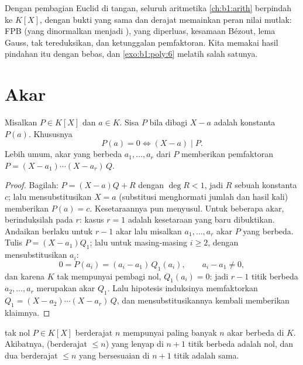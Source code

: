 \begin{remark}[{Aritmetika $K[X]$}]
Dengan pembagian Euclid di tangan, seluruh aritmetika
\cref{ch:b1:arith} berpindah ke $K[X]$, dengan bukti yang sama dan derajat
memainkan peran nilai mutlak: FPB (yang dinormalkan menjadi ),
 yang diperluas, kesamaan Bézout, lema Gauss,
 tak tereduksikan, dan ketunggalan pemfaktoran. Kita memakai hasil
pindahan itu dengan bebas, dan \cref{exo:b1:poly:6} melatih salah satunya.
\end{remark}

\section{Akar}

\begin{theorem}\label{thm:b1:poly:factor}
Misalkan $P \in K[X]$ dan $a \in K$. Sisa $P$ bila dibagi
$X - a$ adalah konstanta $P(a)$. Khususnya
\[
P(a) = 0 \iff (X - a) \mid P .
\]
Lebih umum, akar yang berbeda $a_1, \dots, a_r$ dari $P$ memberikan
pemfaktoran $P = (X - a_1)\cdots(X - a_r)\, Q$.
\end{theorem}

\begin{proof}
Bagilah: $P = (X - a) Q + R$ dengan $\deg R < 1$, jadi $R$ sebuah konstanta
$c$; lalu mensubstitusikan $X = a$ (substitusi menghormati jumlah dan hasil kali)
memberikan $P(a) = c$. Kesetaraannya pun menyusul. Untuk beberapa akar,
berinduksilah pada $r$: kasus $r = 1$ adalah kesetaraan yang baru dibuktikan.
Andaikan  berlaku untuk $r - 1$ akar lalu misalkan $a_1, \dots, a_r$
akar $P$ yang berbeda. Tulis $P = (X - a_1)Q_1$; lalu untuk masing-masing $i
\geq 2$, dengan mensubstitusikan $a_i$:
\[
0 = P(a_i) = (a_i - a_1)\,Q_1(a_i),
\qquad a_i - a_1 \neq 0 ,
\]
dan karena $K$ tak mempunyai pembagi nol, $Q_1(a_i) = 0$: jadi $r - 1$
titik berbeda $a_2, \dots, a_r$ merupakan akar $Q_1$. Lalu
hipotesis induksinya memfaktorkan $Q_1 = (X - a_2)\cdots(X - a_r)\,Q$,
dan mensubstitusikannya kembali memberikan klaimnya.
\end{proof}

\begin{corollary}\label{cor:b1:poly:nroots}
 tak nol $P \in K[X]$ berderajat $n$ mempunyai paling banyak $n$ akar berbeda
di $K$. Akibatnya,  (berderajat $\leq n$) yang lenyap di
$n + 1$ titik berbeda adalah  nol, dan dua 
berderajat $\leq n$ yang bersesuaian di $n+1$ titik adalah sama.
\end{corollary}

